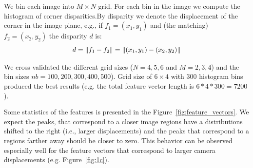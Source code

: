 \documentclass{article}
\DeclarePairedDelimiter{\norm}{\lVert}{\rVert}
\begin{document}
We bin each image into $M\times N$ grid.  For each bin in the image we
compute the histogram of corner disparities.By disparity we denote the
displacement of the corner in the image plane, e.g., if
$f_1=(x_1,y_1)$ and (the matching)
$f_2=(x_2,y_2)$ the disparity $d$ is:
\[
d = \norm{f_1-f_2} = \norm{(x_1,y_1)-(x_2,y_2)}
\]

We cross validated the different grid sizes ($N=4,5,6$ and $M=2,3,4$)
and the bin sizes $nb=100,200,300,400,500$).  Grid size of $6\times 4$
with $300$ histogram bins produced the best results (e.g. the total
feature vector length is $6*4*300=7200$).

Some statistics of the features is presented in the
Figure~\ref{fig:feature_vectors}. We expect the peaks, that correspond
to a closer image regions have a distributions shifted to the right
(i.e., larger displacements) and the peaks that correspond to a
regions farther away should be closer to zero.  This behavior can be
observed especially well for the feature vectors that correspond to
larger camera displacements (e.g. Figure~\ref{fig:1c}).
\end{document}
